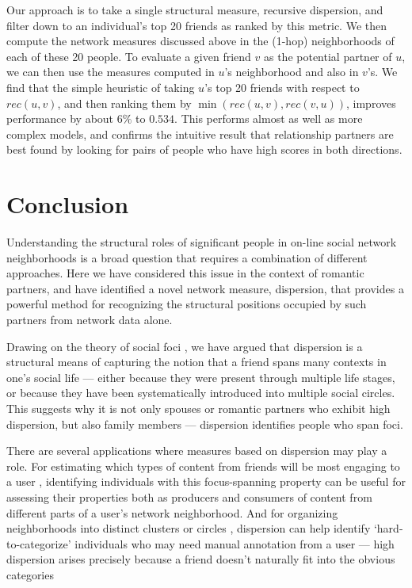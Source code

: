 \documentclass{sigchi}
\begin{document}
Our approach is to take a single structural measure, recursive 
dispersion, and 
filter down to an individual's top 20 friends as ranked by this metric. 
We then compute the network measures discussed above in the (1-hop)
neighborhoods of each of these 20 people.
To evaluate a given friend $v$ as the potential partner of $u$, we
can then use the measures computed in $u$'s neighborhood and also in $v$'s.
We find that the simple heuristic of taking $u$'s top 20 friends 
with respect to $rec(u,v)$, and then ranking them by 
$\min(rec(u,v),rec(v,u))$,
improves performance by about $6\%$ to $0.534$.
This performs almost as well as more complex models, and confirms the
intuitive result that
relationship partners are best found by looking for pairs of people who have
high scores in both directions.

\section{Conclusion}

Understanding the structural roles of significant people in 
on-line social network neighborhoods is a broad question that
requires a combination of different approaches.
Here we have considered this issue in the context of 
romantic partners, and have identified a novel network measure,
dispersion, that provides a powerful method for recognizing
the structural positions occupied by such partners from network data alone.

Drawing on the theory of social foci \cite{feld-foci}, we have
argued that dispersion is a structural means of capturing the notion 
that a friend spans many contexts in one's social life --- either
because they were present through multiple life stages, or because they 
have been systematically introduced into multiple social circles.
This suggests why it is not only spouses or romantic partners who 
exhibit high dispersion, but also family members --- 
dispersion identifies people who span foci.

There are several applications where
measures based on dispersion may play a role.
For estimating which types of content from friends will be most
engaging to a user \cite{backstrom-wsdm13}, 
identifying individuals with this 
focus-spanning property can be useful for assessing
their properties both as producers and consumers of content
from different parts of a user's network neighborhood.
And for organizing neighborhoods into distinct clusters or circles
\cite{mcauley-social-circles,min-social-roles-cscw13},
dispersion can help identify `hard-to-categorize'
individuals who may need manual annotation from a user ---
high dispersion arises precisely because a friend doesn't naturally
fit into the obvious categories
\end{document}
